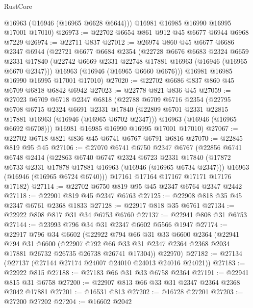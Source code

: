 \begin{lexlean}{RustCore}
\begin{coremodule}
        @16963
        (@16946 (@16965 @6628 @6644)))
      @16981
      @16985
      @16990
      @16995
      @17001
      @17010)
@26973 := @22702 @6654 @861 @912 @45 @6677 @6944 @6968 @7229
@26974 := @22711 @837
@27012 := @26974
    @860
    @45
    @6677
    @6686
    @2347
    @6944
    (@22721
      @6677
      @6684
      @2354
      (@22728
        @6676
        @6683
        @2324
        @6659
        @2331
        @17840
        (@22742 @6669 @2331 @22748 @17881 @16963 (@16946 (@16965 @6670 @2347)))
        @16963
        (@16946 (@16965 @6660 @6676)))
      @16981
      @16985
      @16990
      @16995
      @17001
      @17010)
@27020 := @22702 @6686 @837 @860 @45 @6709 @6818 @6842 @6942
@27023 := @22778 @821 @836 @45
@27059 := @27023
    @6709
    @6718
    @2347
    @6818
    (@22788
      @6709
      @6716
      @2354
      (@22795
        @6708
        @6715
        @2324
        @6691
        @2331
        @17840
        (@22809 @6701 @2331 @22815 @17881 @16963 (@16946 (@16965 @6702 @2347)))
        @16963
        (@16946 (@16965 @6692 @6708)))
      @16981
      @16985
      @16990
      @16995
      @17001
      @17010)
@27067 := @22702 @6718 @821 @836 @45 @6741 @6767 @6791 @6816
@27070 := @22845 @819 @95 @45
@27106 := @27070
    @6741
    @6750
    @2347
    @6767
    (@22856
      @6741
      @6748
      @2414
      (@22863
        @6740
        @6747
        @2324
        @6723
        @2331
        @17840
        (@17872 @6733 @2331 @17878 @17881 @16963 (@16946 (@16965 @6734 @2347)))
        @16963
        (@16946 (@16965 @6724 @6740)))
      @17161
      @17164
      @17167
      @17171
      @17176
      @17182)
@27114 := @22702 @6750 @819 @95 @45 @2347 @6764 @2347 @2442
@27118 := @22901 @819 @45 @2347 @6763
@27125 := @22908 @818 @35 @45 @2347 @6761 @2368 @1833
@27128 := @22917 @818 @35 @6761
@27134 := @22922 @808 @817 @31 @34 @6753 @6760
@27137 := @22941 @808 @31 @6753
@27144 := @23993 @796 @34 @31 @2347 @6602 @5566 @1947
@27174 := @22917
    @796
    @34
    @6602
    (@22922
      @794
      @66
      @31
      @33
      @6600
      @2364
      (@22941
        @794
        @31
        @6600
        (@22907 @792 @66 @33 @31 @2347 @2364 @2368 @2034 @17881 @26732 @26735 @26738 @26741 @17304))
      @22970)
@27182 := @27134 (@27137 (@27144 @27174 @24007 @24010 @24013 @24016 @24021))
@27183 := @22922 @815
@27188 := @27183 @66 @31 @33 @6758 @2364
@27191 := @22941 @815 @31 @6758
@27200 := @22907 @813 @66 @33 @31 @2347 @2364 @2368 @2042 @17881
@27201 := @16531 @813
@27202 := @16728 @27201
@27203 := @27200 @27202
@27204 := @16602 @2042

\end{coremodule}
\end{lexlean}
